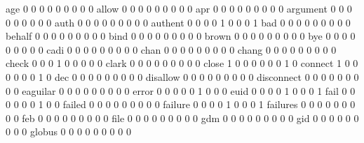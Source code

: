 \documentclass[compress,8pt]{beamer}
\begin{document}
\begin{frame}
\begin{Schunk}
  age                                        0   0   0   0   0   0   0   0   0
  allow                                      0   0   0   0   0   0   0   0   0
  apr                                        0   0   0   0   0   0   0   0   0
  argument                                   0   0   0   0   0   0   0   0   0
  auth                                       0   0   0   0   0   0   0   0   0
  authent                                    0   0   0   0   1   0   0   0   1
  bad                                        0   0   0   0   0   0   0   0   0
  behalf                                     0   0   0   0   0   0   0   0   0
  bind                                       0   0   0   0   0   0   0   0   0
  brown                                      0   0   0   0   0   0   0   0   0
  bye                                        0   0   0   0   0   0   0   0   0
  cadi                                       0   0   0   0   0   0   0   0   0
  chan                                       0   0   0   0   0   0   0   0   0
  chang                                      0   0   0   0   0   0   0   0   0
  check                                      0   0   0   1   0   0   0   0   0
  clark                                      0   0   0   0   0   0   0   0   0
  close                                      1   0   0   0   0   0   0   1   0
  connect                                    1   0   0   0   0   0   0   1   0
  dec                                        0   0   0   0   0   0   0   0   0
  disallow                                   0   0   0   0   0   0   0   0   0
  disconnect                                 0   0   0   0   0   0   0   0   0
  eaguilar                                   0   0   0   0   0   0   0   0   0
  error                                      0   0   0   0   0   1   0   0   0
  euid                                       0   0   0   0   1   0   0   0   1
  fail                                       0   0   0   0   0   0   1   0   0
  failed                                     0   0   0   0   0   0   0   0   0
  failure                                    0   0   0   0   1   0   0   0   1
  failures                                   0   0   0   0   0   0   0   0   0
  feb                                        0   0   0   0   0   0   0   0   0
  file                                       0   0   0   0   0   0   0   0   0
  gdm                                        0   0   0   0   0   0   0   0   0
  gid                                        0   0   0   0   0   0   0   0   0
  globus                                     0   0   0   0   0   0   0   0   0

\end{Schunk}
\end{frame}
\end{document}
